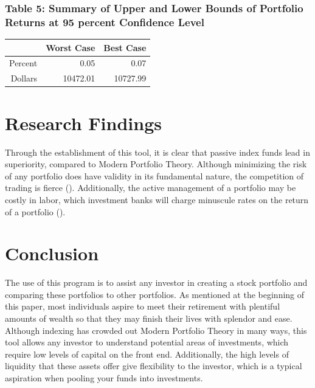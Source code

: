 \documentclass[12pt,english]{article}
\begin{document}
\begin{doublespace}
            \subsubsection{Table 5: Summary of Upper and Lower Bounds of Portfolio Returns at 95 percent Confidence Level}
                \begin{table}[H]
                \centering
                \begin{tabular}{rrr}
                  \hline
                 & Worst Case & Best Case \\ 
                  \hline
                Percent & 0.05 & 0.07 \\ 
                  Dollars & 10472.01 & 10727.99 \\ 
                   \hline
                \end{tabular}
                \end{table}

    \section{Research Findings}\label{sec:results}\indent{}\indent{} %
    
        Through the establishment of this tool, it is clear that passive index funds lead in superiority, compared to Modern Portfolio Theory. Although minimizing the risk of any portfolio does have validity in its fundamental nature, the competition of trading is fierce (\citet{Zucker2020}). Additionally, the active management of a portfolio may be costly in labor, which investment banks will charge minuscule rates on the return of a portfolio (\citet{Zucker2020}).
    
    \section{Conclusion}\label{sec:conclusion}\indent{}\indent{} %
        The use of this program is to assist any investor in creating a stock portfolio and comparing these portfolios to other portfolios. As mentioned at the beginning of this paper, most individuals aspire to meet their retirement with plentiful amounts of wealth so that they may finish their lives with splendor and ease. Although indexing has crowded out Modern Portfolio Theory in many ways, this tool allows any investor to understand potential areas of investments, which require low levels of capital on the front end. Additionally, the high levels of liquidity that these assets offer give flexibility to the investor, which is a typical aspiration when pooling your funds into investments.
    
        \end{doublespace}
    
\end{document}
